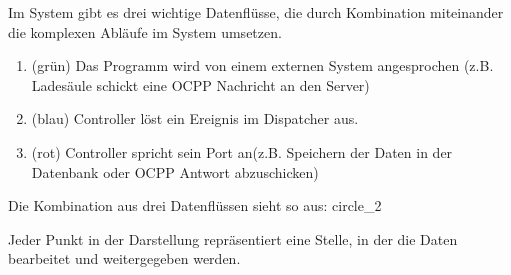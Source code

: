 Im System gibt es drei wichtige Datenflüsse, die durch Kombination miteinander die komplexen Abläufe im System umsetzen.
\begin{enumerate}
    \item (grün) Das Programm wird von einem externen System angesprochen (z.B. Ladesäule schickt eine OCPP Nachricht an den Server) 
    \item (blau) Controller löst ein Ereignis im Dispatcher aus.
    \item (rot) Controller spricht sein Port an(z.B. Speichern der Daten in der Datenbank oder OCPP Antwort abzuschicken)
\end{enumerate}
Die Kombination aus drei Datenflüssen sieht so aus:
{circle_2}

Jeder Punkt in der Darstellung repräsentiert eine Stelle, in der die Daten bearbeitet und weitergegeben werden.
